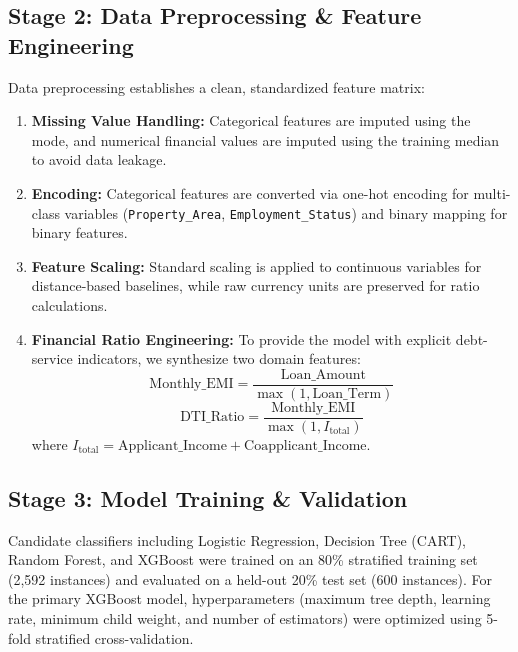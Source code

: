 \documentclass[conference]{IEEEtran}
\begin{document}
\subsection{Stage 2: Data Preprocessing \& Feature Engineering}
Data preprocessing establishes a clean, standardized feature matrix:
\begin{enumerate}
    \item \textbf{Missing Value Handling:} Categorical features are imputed using the mode, and numerical financial values are imputed using the training median to avoid data leakage.
    \item \textbf{Encoding:} Categorical features are converted via one-hot encoding for multi-class variables (\texttt{Property\_Area}, \texttt{Employment\_Status}) and binary mapping for binary features.
    \item \textbf{Feature Scaling:} Standard scaling is applied to continuous variables for distance-based baselines, while raw currency units are preserved for ratio calculations.
    \item \textbf{Financial Ratio Engineering:} To provide the model with explicit debt-service indicators, we synthesize two domain features:
    \begin{equation}
        \text{Monthly\_EMI} = \frac{\text{Loan\_Amount}}{\max(1, \text{Loan\_Term})}
    \end{equation}
    \begin{equation}
        \text{DTI\_Ratio} = \frac{\text{Monthly\_EMI}}{\max(1, I_{\text{total}})}
    \end{equation}
    where $I_{\text{total}} = \text{Applicant\_Income} + \text{Coapplicant\_Income}$.
\end{enumerate}

\subsection{Stage 3: Model Training \& Validation}
Candidate classifiers including Logistic Regression, Decision Tree (CART), Random Forest, and XGBoost were trained on an 80\% stratified training set (2,592 instances) and evaluated on a held-out 20\% test set (600 instances). For the primary XGBoost model, hyperparameters (maximum tree depth, learning rate, minimum child weight, and number of estimators) were optimized using 5-fold stratified cross-validation.
\end{document}
